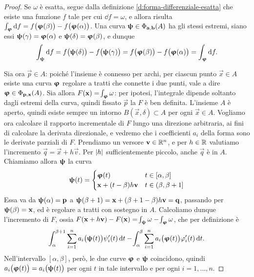 \begin{proof}
	Se $\omega$ è esatta, segue dalla definizione \ref{d:forma-differenziale-esatta} che esiste una funzione $f$ tale per cui $\dd f=\omega$, e allora risulta $\int_{\bm{\upvarphi}}\textup{d} f=f\big(\bm{\upvarphi}(\beta)\big)-f\big(\bm{\upvarphi}(\alpha)\big)$.
	Una curva $\bm{\uppsi}\in\Phi_{\mathbf{a},\mathbf{b}}(A)$ ha gli stessi estremi, siano essi $\bm{\uppsi}(\gamma)=\bm{\upvarphi}(\alpha)$ e $\bm{\uppsi}(\delta)=\bm{\upvarphi}(\beta)$, e dunque
	\begin{equation}
		\int_{\bm{\uppsi}}\textup{d} f=f\big(\bm{\uppsi}(\delta)\big)-f\big(\bm{\uppsi}(\gamma)\big)=f\big(\bm{\upvarphi}(\beta)\big)-f\big(\bm{\upvarphi}(\alpha)\big)=\int_{\bm{\upvarphi}}\textup{d} f.
	\end{equation}
	
	Sia ora $\vec p\in A$: poiché l'insieme è connesso per archi, per ciascun punto $\vec x\in A$ esiste una curva $\bm{\upvarphi}$ regolare a tratti che connette i due punti, vale a dire $\bm{\upvarphi}\in\Phi_{\mathbf{p},\mathbf{x}}(A)$.
	Sia allora $F(\mathbf{x})=\!\int_{\bm{\upvarphi}}\omega$: per ipotesi, l'integrale dipende soltanto dagli estremi della curva, quindi fissato $\vec p$ la $F$ è ben definita.
	L'insieme $A$ è aperto, quindi esiste sempre un intorno $B(\vec x,\delta)\subset A$ per ogni $\vec x\in A$.
	Vogliamo ora calcolare il rapporto incrementale di $F$ lungo una direzione arbitraria, ai fini di calcolare la derivata direzionale, e vedremo che i coefficienti $a_i$ della forma sono le derivate parziali di $F$.
	Prendiamo un versore $\mathbf{v}\in\mathbb{R}^n$, e per $h\in\mathbb{R}$ valutiamo l'incremento $\vec q=\vec x+h\vec v$.
	Per $\left|{h}\right|$ sufficientemente piccolo, anche $\vec q$ è in $A$.
	Chiamiamo allora $\bm{\uppsi}$ la curva
	\begin{equation*}
		\bm{\uppsi}(t)=
		\begin{cases}
			\bm{\upvarphi}(t)	&t\in[\alpha,\beta]\\
			\mathbf{x}+(t-\beta)h\mathbf{v}	&t\in(\beta,\beta+1]
		\end{cases}
	\end{equation*}
	Essa va da $\bm{\uppsi}(\alpha)=\mathbf{p}$ a $\bm{\uppsi}(\beta+1)=\mathbf{x}+(\beta+1-\beta)h\mathbf{v}=\mathbf{q}$, passando per $\bm{\uppsi}(\beta)=\mathbf{x}$, ed è regolare a tratti con sostegno in $A$.
	Calcoliamo dunque l'incremento di $F$, ossia $F(\mathbf{x}+h\mathbf{v})-F(\mathbf{x})=\!\int_{\bm{\uppsi}}\omega-\!\int_{\bm{\upvarphi}}\omega$, che per definizione è
	\begin{equation}
		\!\int_\alpha^{\beta+1}\sum_{i=1}^na_i\big(\bm{\uppsi}(t)\big)\psi_i'(t)\,\textup{d} t-\!\int_\alpha^\beta\sum_{i=1}^na_i\big(\bm{\upvarphi}(t)\big)\varphi_i'(t)\,\textup{d} t.
	\end{equation}
	Nell'intervallo $[\alpha,\beta]$, però, le due curve $\bm{\upvarphi}$ e $\bm{\uppsi}$ coincidono, quindi $a_i\big(\bm{\upvarphi}(t)\big)=a_i\big(\bm{\uppsi}(t)\big)$ per ogni $t$ in tale intervallo e per ogni $i=1,\dots,n$.

\end{proof}
